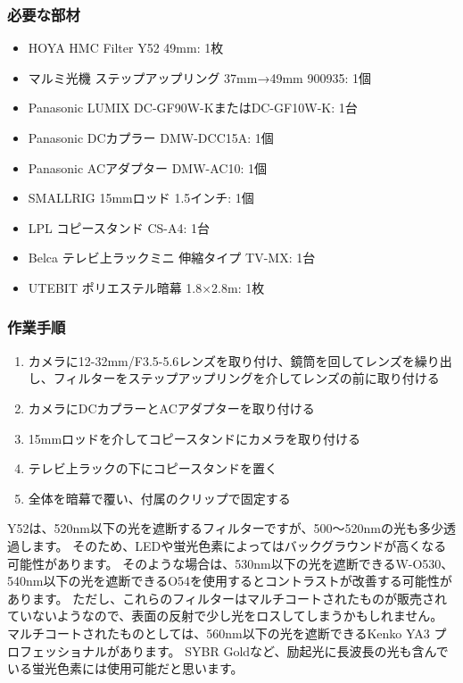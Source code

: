 \documentclass[titlepage,10pt,a4paper,uplatex]{jsbook}
\begin{document}
\subsubsection{必要な部材}
\begin{itemize}
\item HOYA HMC Filter Y52 49mm: 1枚
\item マルミ光機 ステップアップリング 37mm→49mm 900935: 1個
\item Panasonic LUMIX DC-GF90W-KまたはDC-GF10W-K: 1台
\item Panasonic DCカプラー DMW-DCC15A: 1個
\item Panasonic ACアダプター DMW-AC10: 1個
\item SMALLRIG 15mmロッド 1.5インチ: 1個
\item LPL コピースタンド CS-A4: 1台
\item Belca テレビ上ラックミニ 伸縮タイプ TV-MX: 1台
\item UTEBIT ポリエステル暗幕 1.8×2.8m: 1枚
\end{itemize}

\subsubsection{作業手順}
\begin{enumerate}
\item カメラに12-32mm/F3.5-5.6レンズを取り付け、鏡筒を回してレンズを繰り出し、フィルターをステップアップリングを介してレンズの前に取り付ける
\item カメラにDCカプラーとACアダプターを取り付ける
\item 15mmロッドを介してコピースタンドにカメラを取り付ける
\item テレビ上ラックの下にコピースタンドを置く
\item 全体を暗幕で覆い、付属のクリップで固定する
\end{enumerate}

Y52は、520nm以下の光を遮断するフィルターですが、500～520nmの光も多少透過します。
そのため、LEDや蛍光色素によってはバックグラウンドが高くなる可能性があります。
そのような場合は、530nm以下の光を遮断できるW-O530、540nm以下の光を遮断できるO54を使用するとコントラストが改善する可能性があります。
ただし、これらのフィルターはマルチコートされたものが販売されていないようなので、表面の反射で少し光をロスしてしまうかもしれません。
マルチコートされたものとしては、560nm以下の光を遮断できるKenko YA3 プロフェッショナルがあります。
SYBR Goldなど、励起光に長波長の光も含んでいる蛍光色素には使用可能だと思います。
\end{document}

